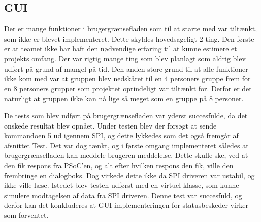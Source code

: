\subsection{GUI}

Der er mange funktioner i brugergrænsefladen som til at starte med var tiltænkt, som ikke er blevet implementeret. Dette skyldes hovedsageligt 2 ting. Den 
første er at teamet ikke har haft den nødvendige erfaring til at kunne estimere et projekts omfang. Der var rigtig mange ting som blev planlagt som aldrig blev
 udført på grund af mangel på tid. Den anden store grund til at alle funktioner ikke kom med var at gruppen blev nedskåret til en 4 personers gruppe frem for en 
 8 personers grupper som projektet oprindeligt var tiltænkt for. Derfor er det naturligt at gruppen ikke kan nå lige så meget som en gruppe på 8 personer.

De tests som blev udført på brugergrænsefladen var yderst succesfulde, da det ønskede resultat blev opnået. Under testen blev der forsøgt at sende kommandoen 5 
ud igennem SPI, og dette lykkedes som det også fremgår af afsnittet Test.  Det var dog tænkt, og i første omgang implementeret således at brugergrænsefladen kan 
meddele brugeren meddelelse. Dette skulle ske, ved at den fik respons fra PSoC’en, og alt efter hvilken respons den fik, ville den frembringe en dialogboks. Dog 
virkede dette ikke da SPI driveren var ustabil, og ikke ville læse. Istedet blev testen udførst med en virtuel klasse, som kunne simulere modtagelsen af data
fra SPI driveren. Denne test var succesfuld, og derfor kan det konkluderes at GUI implementeringen for statusbeskeder virker som forventet.
